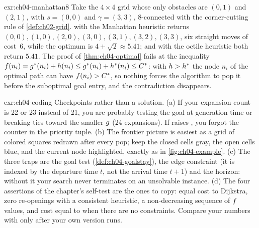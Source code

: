 \begin{solution}{exr:ch04-manhattan8}
Take the $4\times4$ grid whose only obstacles are $(0,1)$ and $(2,1)$, with $s=(0,0)$ and $\gamma=(3,3)$, 8-connected with the corner-cutting rule of \cref{def:ch02-grid}. \astar with the Manhattan heuristic returns $(0,0),(1,0),(2,0),(3,0),(3,1),(3,2),(3,3)$, six straight moves of cost~6, while the optimum is $4+\sqrt2\approx5.41$;  and \astar with the octile heuristic both return $5.41$. The proof of \cref{thm:ch04-optimal} fails at the inequality $f(n_i)=g^*(n_i)+h(n_i)\le g^*(n_i)+h^*(n_i)\le C^*$: with $h>h^*$ the node $n_i$ of the optimal path can have $f(n_i)>C^*$, so nothing forces the algorithm to pop it before the suboptimal goal entry, and the contradiction disappears.
\end{solution}

\begin{solution}{exr:ch04-coding}
Checkpoints rather than a solution. (a) If your expansion count is 22 or 23 instead of 21, you are probably testing the goal at generation time or breaking ties toward the smaller $g$ (24 expansions). If \python raises , you forgot the counter in the priority tuple. (b) The frontier picture is easiest as a grid of colored squares redrawn after every pop; keep the closed cells gray, the open cells blue, and the current node highlighted, exactly as in \cref{fig:ch04-example}. (c) The three traps are the goal test (\cref{def:ch04-goalstay}), the edge constraint (it is indexed by the departure time $t$, not the arrival time $t+1$) and the horizon: without it your search never terminates on an unsolvable instance. (d) The four assertions of the chapter's self-test are the ones to copy: equal cost to Dijkstra, zero re-openings with a consistent heuristic, a non-decreasing sequence of $f$ values, and  cost equal to  when there are no constraints. Compare your numbers with  only after your own version runs.
\end{solution}

